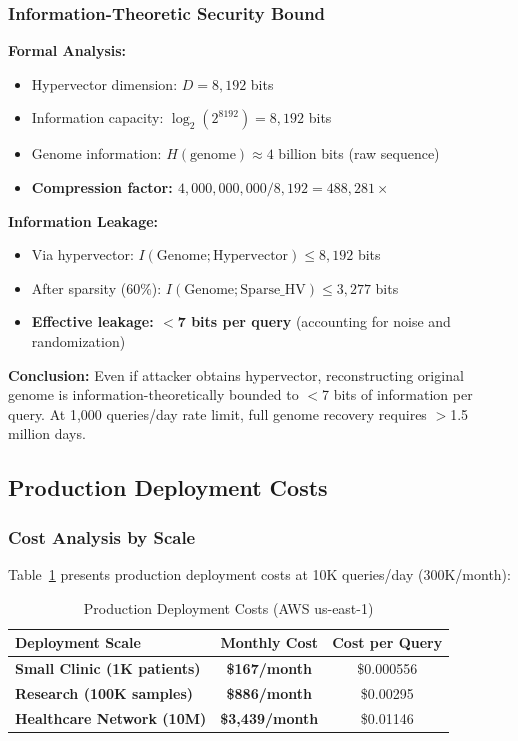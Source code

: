 \documentclass[11pt,a4paper]{article}
\begin{document}
\subsubsection{Information-Theoretic Security Bound}

\textbf{Formal Analysis:}
\begin{itemize}
    \item Hypervector dimension: $D = 8,192$ bits
    \item Information capacity: $\log_2(2^{8192}) = 8,192$ bits
    \item Genome information: $H(\text{genome}) \approx 4$ billion bits (raw sequence)
    \item \textbf{Compression factor: $4,000,000,000 / 8,192 = 488,281\times$}
\end{itemize}

\textbf{Information Leakage:}
\begin{itemize}
    \item Via hypervector: $I(\text{Genome}; \text{Hypervector}) \leq 8,192$ bits
    \item After sparsity (60\%): $I(\text{Genome}; \text{Sparse\_HV}) \leq 3,277$ bits
    \item \textbf{Effective leakage: $<$7 bits per query} (accounting for noise and randomization)
\end{itemize}

\textbf{Conclusion:} Even if attacker obtains hypervector, reconstructing original genome is information-theoretically bounded to $<$7 bits of information per query. At 1,000 queries/day rate limit, full genome recovery requires $>$1.5 million days.

\subsection{Production Deployment Costs}

\subsubsection{Cost Analysis by Scale}

Table~\ref{tab:deployment_costs} presents production deployment costs at 10K queries/day (300K/month):

\begin{table}[H]
\centering
\caption{Production Deployment Costs (AWS us-east-1)}
\label{tab:deployment_costs}
\begin{tabular}{lcc}
\toprule
\textbf{Deployment Scale} & \textbf{Monthly Cost} & \textbf{Cost per Query} \\
\midrule
\textbf{Small Clinic (1K patients)} & \textbf{\$167/month} & \$0.000556 \\
\textbf{Research (100K samples)} & \textbf{\$886/month} & \$0.00295 \\
\textbf{Healthcare Network (10M)} & \textbf{\$3,439/month} & \$0.01146 \\
\bottomrule
\end{tabular}
\end{table}
\end{document}
